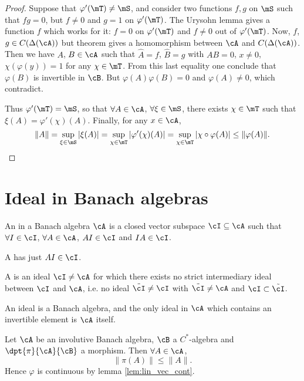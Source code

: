 \begin{proof}
Suppose that $\varphi'(\mT)\neq\mS$, and consider two functions $f,g$ on $\mS$ such that $fg=0$, but $f\neq 0$ and $g=1$ on $\varphi'(\mT)$. The Urysohn lemma gives a function $f$ which works for it: $f=0$ on $\varphi'(\mT)$ and $f\neq 0$ out of $\varphi'(\mT)$. Now, $f$, $g\in C(\Delta(\cA))$ but theorem  gives a homomorphism between $\cA$ and $C(\Delta(\cA))$. Then we have $A$, $B\in\cA$ such that $\hat{A}=f$,  $\hat{B}=g$ with $AB=0$, $x\neq 0$, $\chi(\varphi(y))=1$ for any $\chi\in\mT$. From this last equality one conclude that $\varphi(B)$ is invertible in $\cB$. But $\varphi(A)\varphi(B)=0$ and $\varphi(A)\neq 0$, which contradict.

Thus $\varphi'(\mT)=\mS$, so that $\forall A\in\cA$, $\forall\xi\in\mS$, there exists $\chi\in\mT$ such that $\xi(A)=\varphi'(\chi)(A)$. Finally, for any $x\in\cA$,
\begin{equation}
 \|A\|=\sup_{\xi\in\mS}|\xi(A)|
      =\sup_{\chi\in\mT}|\varphi'(\chi)(A)|
      =\sup_{\chi\in\mT}|\chi\circ\varphi(A)|
      \leq\|\varphi(A)\|.
\end{equation}

\end{proof}



\section{Ideal in Banach algebras}

\begin{definition}
An  in a Banach algebra $\cA$ is a closed vector subspace $\cI\subseteq\cA$ such that $\forall I\in\cI$, $\forall A\in\cA$, $AI\in\cI$ and $IA\in\cI$.

A  has just $AI\in\cI$.

A   is an ideal $\cI\neq\cA$ for which there exists no strict intermediary ideal between $\cI$ and $\cA$, i.e. no ideal $\tilde{\cI}\neq\cI$  with $\tilde{\cI}\neq\cA$ and $\cI\subset\tilde{\cI}$.
\end{definition}

An ideal is a Banach algebra, and the only ideal in $\cA$ which contains an invertible element is $\cA$ itself.



\begin{proposition} \label{prop:vp_leq}
Let $\cA$ be an involutive Banach algebra, $\cB$ a $C^{*}$-algebra and $\dpt{\pi}{\cA}{\cB}$ a morphism. Then $\forall A\in\cA$,
\begin{equation}  \label{eq_morleqpi}
  \|\pi(A)\|\leq\|A\|.
\end{equation}
Hence $\varphi$ is continuous by lemma \ref{lem:lin_vec_cont}. 
\end{proposition}

